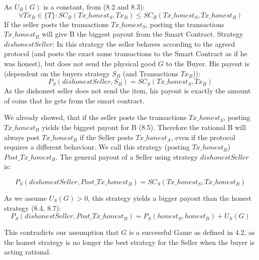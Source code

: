 \documentclass{cacthesis}
\begin{document}
As $U_B(G)$ is a constant, from (8.2 and 8.3):
\begin{equation}
    \forall Tx_B \in \{T\}: SC_B(Tx\_honest_S, Tx_B) \leq SC_B(Tx\_honest_S, Tx\_honest_B)
\end{equation}
If the seller posts the transactions $Tx\_honest_S$, posting the transactions $Tx\_honest_B$ will give B the biggest payout from the Smart Contract.
Strategy $dishonestSeller$: In this strategy the seller behaves according to the agreed protocol (and posts the exact same transactions to the Smart Contract as if he was honest), but does not send the physical good $G$ to the Buyer.\newline
His payout is (dependent on the buyers strategy $S_B$ (and Transactions $Tx_B$)):
\begin{equation}
    P_S(dishonestSeller,S_B) = SC_S(Tx\_honest_S,Tx_B)
\end{equation}
As the dishonest seller does not send the item, his payout is exactly the amount of coins that he gets from the smart contract.\newline

We already showed, that if the seller posts the transactions $Tx\_honest_S$, posting $Tx\_honest_B$ yields the biggest payout for B (8.5).\newline
Therefore the rational B will always post $Tx\_honest_B$ if the Seller posts $Tx\_honest_A$, even if the protocol requires a different behaviour. We call this strategy (posting $Tx\_honest_B$) $Post\_Tx\_honest_B$.\newline
The general payout of a Seller using strategy $dishonestSeller$ is:

\begin{equation}
    P_S(dishonestSeller,Post\_Tx\_honest_B) = SC_S(Tx\_honest_S,Tx\_honest_B)
\end{equation}

As we assume $U_S(G) > 0$, this strategy yields a bigger payout than the honest strategy (8.4, 8.7):
\[P_S(dishonestSeller,Post\_Tx\_honest_B) = P_S(honest_S,honest_B) + U_S(G)\]

This contradicts our assumption that $G$ is a successful Game as defined in 4.2, as the honest strategy is no longer the best strategy for the Seller when the buyer is acting rational.
	
	
	\printbibliography
	
	\appendix
\end{document}
